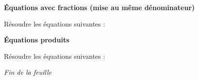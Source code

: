 \documentclass[12pt]{exam}
\begin{document}
\begin{questions}
\vspace{0.5cm}

\question \textbf{Équations avec fractions (mise au même dénominateur)}

Résoudre les équations suivantes :

\vspace{0.5cm}

\question \textbf{Équations produits}

Résoudre les équations suivantes :

\end{questions}

\vspace{0.5cm}

\begin{center}
    \textit{Fin de la feuille}
\end{center}
\end{document}
